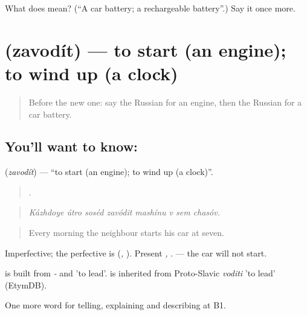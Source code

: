 \begin{tcolorbox}[breakable,colback=teal!4,colframe=teal!35!black,title={Before you move on}]
What does  mean? (\textquotedblleft{}A car battery; a rechargeable battery\textquotedblright{}.) Say it once more.
\end{tcolorbox}
\section[\texorpdfstring{\ru{заводить} (zavodít)}{заводить (zavodít)}]{ (zavodít) — to start (an engine); to wind up (a clock)}

\label{lesson:RU-C404-zavodit}



\begin{quote}
Before the new one: say the Russian for an engine, then the Russian for a car battery.
\end{quote}

\subsection*{You'll want to know: }
\textbf{} (\emph{zavodít}) — \textquotedblleft{}to start (an engine); to wind up (a clock)\textquotedblright{}.

\begin{quote}
       .
\end{quote}

\begin{quote}
\emph{Kázhdoye útro soséd zavódit mashínu v sem chasóv.}
\end{quote}

\begin{quote}
Every morning the neighbour starts his car at seven.
\end{quote}

Imperfective; the perfective is \emph{} (\emph{, }). Present \emph{, }. \emph{  } — the car will not start.

\begin{cousinweb}
\emph{} is built from \emph{-} and \emph{} 'to lead'. \emph{} is inherited from Proto-Slavic \emph{voditi} 'to lead' (EtymDB).
\end{cousinweb}

\begin{grammarlens}[title={What you've built}]
One more word for telling, explaining and describing at B1.
\end{grammarlens}

